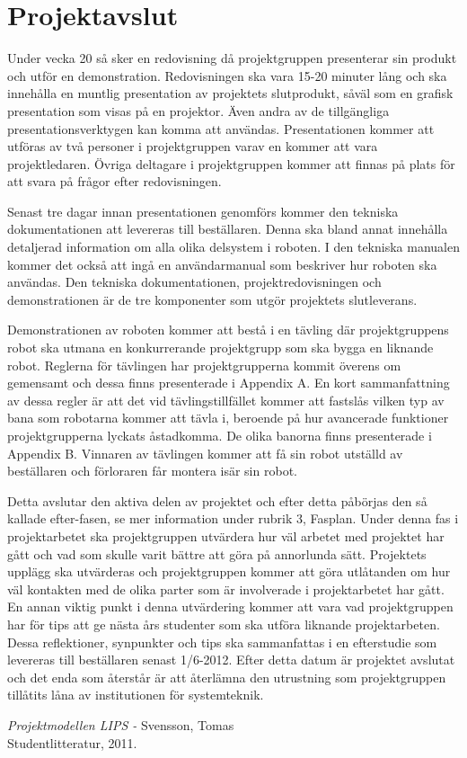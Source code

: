 \documentclass[a4paper,12pt]{article}
\begin{document}
\section{Projektavslut} %

Under vecka 20 så sker en redovisning då projektgruppen presenterar sin produkt och utför en demonstration. Redovisningen ska vara 15-20 minuter lång och ska innehålla en muntlig presentation av projektets slutprodukt, såväl som en grafisk presentation som visas på en projektor. Även andra av de tillgängliga presentationsverktygen kan komma att användas. Presentationen kommer att utföras av två personer i projektgruppen varav en kommer att vara projektledaren. Övriga deltagare i projektgruppen kommer att finnas på plats för att svara på frågor efter redovisningen.

Senast tre dagar innan presentationen genomförs kommer den tekniska dokumentationen att levereras till beställaren. Denna ska bland annat innehålla detaljerad information om alla olika delsystem i roboten. I den tekniska manualen kommer det också att ingå en användarmanual som beskriver hur roboten ska användas. Den tekniska dokumentationen, projektredovisningen och demonstrationen är de tre komponenter som utgör projektets slutleverans. 

Demonstrationen av roboten kommer att bestå i en tävling där projektgruppens robot ska utmana en konkurrerande projektgrupp som ska bygga en liknande robot. Reglerna för tävlingen har projektgrupperna kommit överens om gemensamt och dessa finns presenterade i Appendix A. En kort sammanfattning av dessa regler är att det vid tävlingstillfället kommer att fastslås vilken typ av bana som robotarna kommer att tävla i, beroende på hur avancerade funktioner projektgrupperna lyckats åstadkomma. De olika banorna finns presenterade i Appendix B. Vinnaren av tävlingen kommer att få sin robot utställd av beställaren och förloraren får montera isär sin robot.

Detta avslutar den aktiva delen av projektet och efter detta påbörjas den så kallade efter-fasen, se mer information under rubrik 3, Fasplan. Under denna fas i projektarbetet ska  projektgruppen utvärdera hur väl arbetet med projektet har gått och vad som skulle varit bättre att göra på annorlunda sätt. Projektets upplägg ska utvärderas och projektgruppen kommer att göra utlåtanden om hur väl kontakten med de olika parter som är involverade i projektarbetet har gått. En annan viktig punkt i denna utvärdering kommer att vara vad projektgruppen har för tips att ge nästa års studenter som ska utföra liknande projektarbeten. Dessa reflektioner, synpunkter och tips ska sammanfattas i en efterstudie som levereras till beställaren senast 1/6-2012. Efter detta datum är projektet avslutat och det enda som återstår är att återlämna den utrustning som projektgruppen tillåtits låna av institutionen för systemteknik.


\newpage
\appendix

\newpage


\begin{thebibliography}{99}
\textit{Projektmodellen LIPS - } Svensson, Tomas
\\Studentlitteratur, 2011.
\end{thebibliography}
\end{document}
